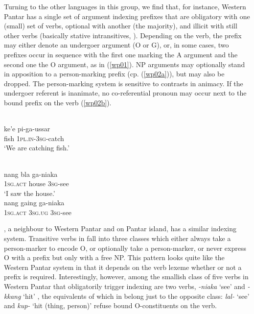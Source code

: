 Turning to the other languages in this group, we find that, for instance, Western Pantar has a single set of argument indexing prefixes that are obligatory with one (small) set of verbs, optional with another (the majority), and illicit with still other verbs (basically stative intransitives, \citealt[76]{holton2014western}). Depending on the verb, the prefix may either denote an undergoer argument (O or G), or, in some cases, two prefixes occur in sequence with the first one marking the A argument and the second one the O argument, as in (\ref{wp01}). NP arguments may optionally stand in apposition to a person-marking prefix (cp. (\ref{wp02a})), but may also be dropped. The person-marking system is sensitive to contrasts in animacy. If the undergoer referent is inanimate, no co-referential pronoun may occur next to the bound prefix on the verb (\ref{wp02b}).

\ea \label{wp01}
\\
\gll ke'e pi-ga-ussar \\
fish \textsc{1}\textsc{pl}.\textsc{in}-\textsc{3}\textsc{sg}-catch \\
\glft `We are catching fish.'\\ 
\z

\ea
{}\\
\ea \label{wp02a}
\gll nang bla ga-niaka \\
\textsc{1}\textsc{sg}.\textsc{act} house \textsc{3}\textsc{sg}-see \\
\glft `I saw the house.' \\ 
\ex \label{wp02b}
\gll *nang gaing ga-niaka \\ 
\textsc{1}\textsc{sg}.\textsc{act} \textsc{3}\textsc{sg}.\textsc{ug} \textsc{3}\textsc{sg}-see \\
\z
\z

, a neighbour to Western Pantar and  on Pantar island, has a similar indexing system. Transitive verbs in  fall into three classes which either always take a person-marker to encode O, or optionally take a person-marker, or never express O with a prefix but only with a free NP. This pattern looks quite like the Western Pantar system in that it depends on the verb lexeme whether or not a prefix is required. Interestingly, however, among the smallish class of five verbs in Western Pantar that obligatorily trigger indexing are two verbs, \textit{-niaka} `see' and \textit{-kkang} `hit' \citep[77]{holton2014western}, the equivalents of which in  belong just to the opposite class: \textit{lal-} `see' and \textit{kup-} `hit (thing, person)' refuse bound O-constituents on the verb. 

